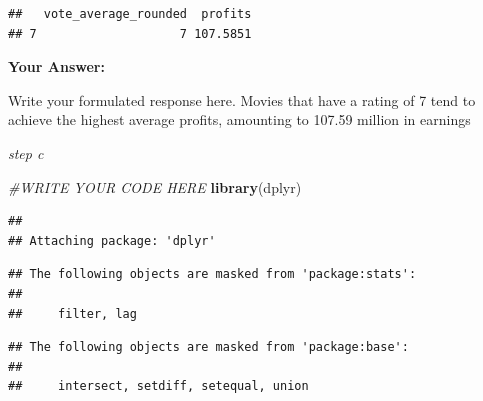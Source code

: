 \documentclass[
]{article}
\newenvironment{Shaded}{\begin{snugshade}}{\end{snugshade}}
\newcommand{\CommentTok}[1]{\textcolor[rgb]{0.56,0.35,0.01}{\textit{#1}}}
\newcommand{\FunctionTok}[1]{\textcolor[rgb]{0.13,0.29,0.53}{\textbf{#1}}}
\newcommand{\NormalTok}[1]{#1}
\newcommand{\SpecialCharTok}[1]{\textcolor[rgb]{0.81,0.36,0.00}{\textbf{#1}}}
\begin{document}
\begin{Shaded}
\end{Shaded}

\begin{verbatim}
##   vote_average_rounded  profits
## 7                    7 107.5851
\end{verbatim}

\textbf{Your Answer:}

Write your formulated response here. Movies that have a rating of 7 tend
to achieve the highest average profits, amounting to 107.59 million in
earnings

\emph{step c}

\begin{Shaded}
\begin{Highlighting}[]
\CommentTok{\#WRITE YOUR CODE HERE}
\FunctionTok{library}\NormalTok{(dplyr)}
\end{Highlighting}
\end{Shaded}

\begin{verbatim}
## 
## Attaching package: 'dplyr'
\end{verbatim}

\begin{verbatim}
## The following objects are masked from 'package:stats':
## 
##     filter, lag
\end{verbatim}

\begin{verbatim}
## The following objects are masked from 'package:base':
## 
##     intersect, setdiff, setequal, union
\end{verbatim}
\end{document}
